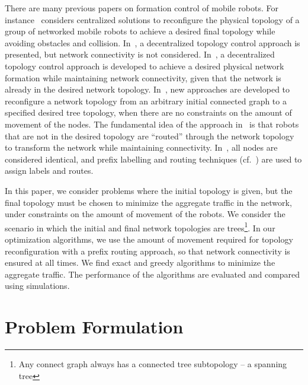 \documentclass[10pt,conference]{IEEEtran}
\begin{document}
There are many previous papers on formation control of mobile robots.
For instance~\cite{Herbert05} considers centralized solutions to
reconfigure the physical topology of a group of networked mobile
robots to achieve a desired final topology while avoiding obstacles
and collision.  In~\cite{Maria06}, a decentralized topology control
approach is presented, but network connectivity is not considered.
In~\cite{ZhenTAC11,KanMILCOM10}, a decentralized topology control
approach is developed to achieve a desired physical network formation
while maintaining network connectivity, given that the network is
already in the desired network topology.  In~\cite{BomMILCOM11}, new
approaches are developed to reconfigure a network topology from an
arbitrary initial connected graph to a specified desired tree
topology, when there are no constraints on the amount of movement of
the nodes.  The fundamental idea of the approach in~\cite{BomMILCOM11}
is that robots that are not in the desired topology are ``routed''
through the network topology to transform the network while
maintaining connectivity.  In~\cite{BomMILCOM11}, all nodes are
considered identical, and prefix labelling and routing techniques
(cf.~\cite{JJGarciaICCCN09,Sampath09,JJGarciaMASS09}) are used to
assign labels and routes.

In this paper, we consider problems where the initial topology is
given, but the final topology must be chosen to minimize the aggregate
traffic in the network, under constraints on the amount of movement of
the robots.  We consider the scenario in which the initial and final
network topologies are trees\footnote{Any connect graph always has a
  connected tree subtopology -- a spanning tree}.  In our optimization
algorithms, we use the amount of movement required for topology
reconfiguration with a prefix routing approach, so that network
connectivity is ensured at all times.  We find exact and greedy
algorithms to minimize the aggregate traffic.  The performance of the
algorithms are evaluated and compared using simulations.





\section{Problem Formulation}
\label{sec:form}
\end{document}
